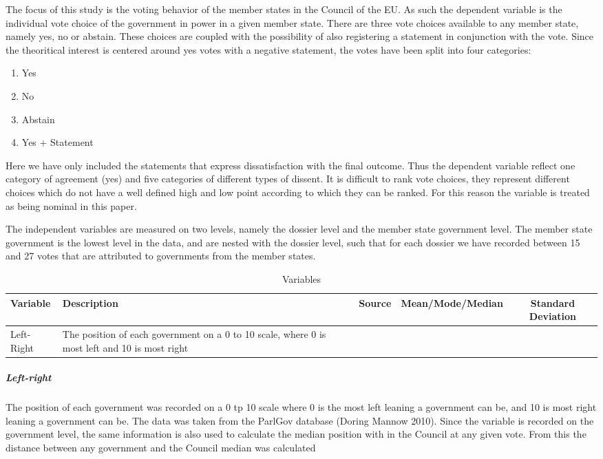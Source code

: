 The focus of this study is the voting behavior of the member states in the Council of the EU. As such the dependent variable is the individual vote choice of the government in power in a given member state. There are three vote choices available to any member state, namely yes, no or abstain. These choices are coupled with the possibility of also registering a statement in conjunction with the vote. Since the theoritical interest is centered around yes votes with a negative statement, the votes have been split into four categories:

\begin{enumerate}
\item Yes
\item No
\item Abstain
\item Yes + Statement
\end{enumerate}

Here we have only included the statements that express dissatisfaction with the final outcome. Thus the dependent variable reflect one category of agreement (yes) and five categories of different types of dissent. It is difficult to rank vote choices, they represent different choices which do not have a well defined high and low point according to which they can be ranked. For this reason the variable is treated as being nominal in this paper. 

The independent variables are measured on two levels, namely the dossier level and the member state government level. The member state government is the lowest level in the data, and are nested with the dossier level, such that for each dossier we have recorded between 15 and 27 votes that are attributed to governments from the member states.

\begin{table}[ht]
  \centering
  \begin{tabular}{l l l c c} \toprule
    Variable & Description & Source &  Mean/Mode/Median & Standard Deviation \\ \midrule
    Left-Right & The position of each government on a 0 to 10 scale, where 0 is most left and 10 is most right & \citet{DoringMannow2010} & & \\ 
    \bottomrule
  \end{tabular}
  \caption{Variables}
  \label{tab:variables}
\end{table}

\subparagraph{Left-right} The position of each government was recorded on a 0 tp 10 scale where 0 is the most left leaning a government can be, and 10 is most right leaning a government can be. The data was taken from the ParlGov database (Doring Mannow 2010). Since the variable is recorded on the government level, the same information is also used to calculate the median position with in the Council at any given vote. From this the distance between any government and the Council median was calculated

